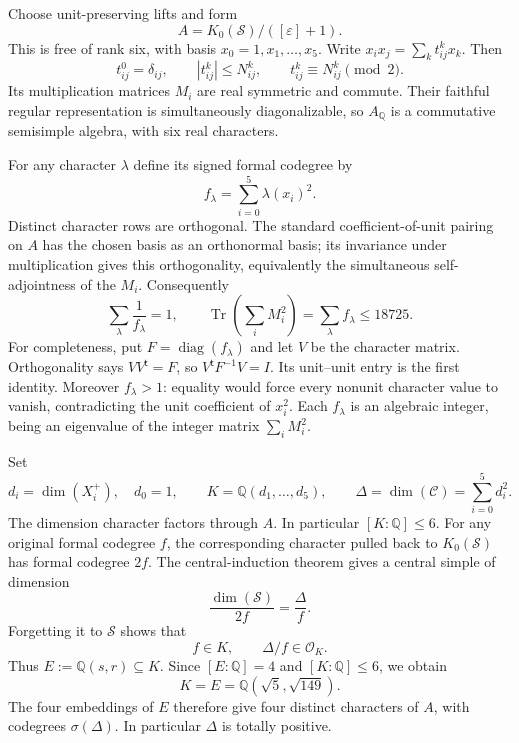 \documentclass[11pt]{article}
\newcommand{\Q}{\mathbb Q}
\newcommand{\Tr}{\operatorname{Tr}}
\newcommand{\OO}{\mathcal O}
\numberwithin{equation}{section}
\begin{document}
Choose unit-preserving lifts and form
\[
A=K_0(\mathcal S)/([\varepsilon]+1).
\]
This is free of rank six, with basis $x_0=1,x_1,\ldots,x_5$. Write
$x_ix_j=\sum_k t_{ij}^kx_k$. Then
\begin{equation}\label{eq:signed}
t_{ij}^0=\delta_{ij},\qquad
|t_{ij}^k|\le N_{ij}^k,\qquad
t_{ij}^k\equiv N_{ij}^k\pmod2.
\end{equation}
Its multiplication matrices $M_i$ are real symmetric and commute. Their faithful
regular representation is simultaneously diagonalizable, so $A_\Q$ is a
commutative semisimple algebra, with six real characters.

For any character $\lambda$ define its signed formal codegree by
\[
f_\lambda=\sum_{i=0}^5\lambda(x_i)^2.
\]
Distinct character rows are orthogonal. The standard coefficient-of-unit
pairing on $A$ has the chosen basis as an orthonormal basis; its invariance
under multiplication gives this orthogonality, equivalently the simultaneous
self-adjointness of the $M_i$. Consequently
\begin{equation}\label{eq:reciprocal}
\sum_\lambda\frac1{f_\lambda}=1,\qquad
\Tr\left(\sum_i M_i^2\right)=\sum_\lambda f_\lambda\le18725.
\end{equation}
For completeness, put $F=\operatorname{diag}(f_\lambda)$ and let $V$ be the
character matrix. Orthogonality says $VV^{\mathsf t}=F$, so
$V^{\mathsf t}F^{-1}V=I$. Its unit--unit entry is the first identity. Moreover $f_\lambda>1$: equality would force every
nonunit character value to vanish, contradicting the unit coefficient of
$x_i^2$. Each $f_\lambda$ is an algebraic integer, being an eigenvalue of the
integer matrix $\sum_iM_i^2$.

Set
\[
d_i=\dim(X_i^+),\quad d_0=1,\qquad
K=\Q(d_1,\ldots,d_5),\qquad
\Delta=\dim(\mathcal C)=\sum_{i=0}^5d_i^2.
\]
The dimension character factors through $A$. In particular $[K:\Q]\le6$.
For any original formal codegree $f$, the corresponding character pulled back
to $K_0(\mathcal S)$ has formal codegree $2f$. The central-induction theorem
\cite[Theorem 2.13]{O3} gives a central simple of dimension
\[
\frac{\dim(\mathcal S)}{2f}=\frac{\Delta}{f}.
\]
Forgetting it to $\mathcal S$ shows that
\begin{equation}\label{eq:field-divisibility}
f\in K,\qquad \Delta/f\in\OO_K.
\end{equation}
Thus $E:=\Q(s,r)\subseteq K$. Since $[E:\Q]=4$ and $[K:\Q]\le6$, we obtain
\begin{equation}\label{eq:field}
K=E=\Q(\sqrt5,\sqrt{149}).
\end{equation}
The four embeddings of $E$ therefore give four distinct characters of $A$,
with codegrees $\sigma(\Delta)$. In particular $\Delta$ is totally positive.
\end{document}
